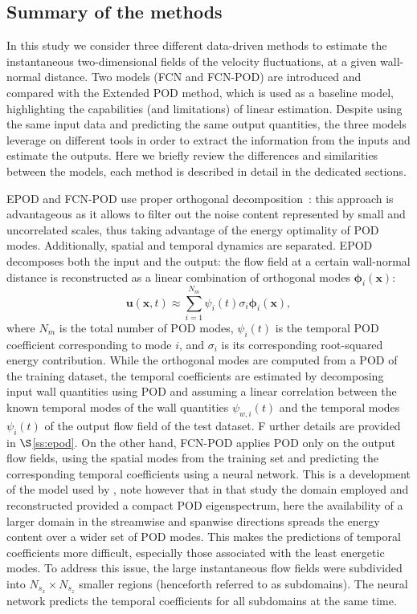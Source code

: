 \subsection{Summary of the methods}\label{meth}
In this study we consider three different data-driven methods to estimate the instantaneous two-dimensional fields of the velocity fluctuations, at a given wall-normal distance.
Two models (FCN and FCN-POD) are introduced and compared with the Extended POD method, which is used as a baseline model, highlighting the capabilities (and limitations) of linear estimation.
Despite using the same input data and predicting the same output quantities, the three models leverage on different tools in order to extract the information from the inputs and estimate the outputs.
Here we briefly review the differences and similarities between the models, each method is described in detail in the dedicated sections.

EPOD and FCN-POD use proper orthogonal decomposition~\cite[POD, see][]{lumley1967structure}: this approach is advantageous as it allows to filter out the noise content represented by small and uncorrelated scales, thus taking advantage of the energy optimality of POD modes.
Additionally, spatial and temporal dynamics are separated.
EPOD decomposes both the input and the output: the flow field at a certain wall-normal distance is reconstructed as a linear combination of orthogonal modes $\boldsymbol{\phi}_i(\boldsymbol{x})$:
\begin{equation}
    \boldsymbol{u}(\boldsymbol{x},t) \approx \sum^{N_m}_{i=1}\psi_i(t)\sigma_i\boldsymbol{\phi}_i(\boldsymbol{x}),
    \label{eq:decom}
\end{equation}
\noindent where $N_m$ is the total number of POD modes, $\psi_i(t)$ is the temporal POD coefficient corresponding to mode $i$, and $\sigma_i$ is its corresponding root-squared energy contribution.
While the orthogonal modes are computed from a POD of the training dataset, the temporal coefficients are estimated by decomposing input wall quantities using POD and assuming a linear correlation between the known temporal modes of the wall quantities $\psi_{w,i}(t)$ and the temporal modes $\psi_i(t)$ of the output flow field of the test dataset. F
urther details are provided in $\S$\ref{ss:epod}.
On the other hand, FCN-POD applies POD only on the output flow fields, using the spatial modes from the training set and predicting the corresponding temporal coefficients using a neural network.
This is a development of the model used by \citet{guemes2019sensing}, note however that in that study the domain employed and reconstructed provided a compact POD eigenspectrum, here the availability of a larger domain in the streamwise and spanwise directions spreads the energy content over a wider set of POD modes.
This makes the predictions of temporal coefficients more difficult, especially those associated with the least energetic modes.
To address this issue, the large instantaneous flow fields were subdivided into $N_{s_x}\times N_{s_z}$ smaller regions (henceforth referred to as subdomains).
The neural network predicts the temporal coefficients for all subdomains at the same time.

